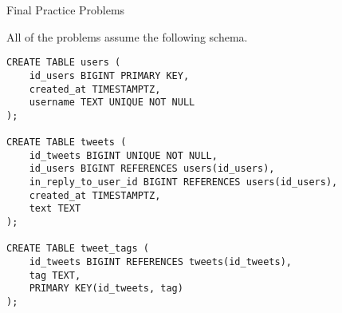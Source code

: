 \documentclass[12pt]{exam}
\theoremstyle{definition}
\begin{document}
\begin{center}
    {
\Large
Final Practice Problems
}
\end{center}

\noindent
All of the problems assume the following schema.
\begin{lstlisting}
CREATE TABLE users (
    id_users BIGINT PRIMARY KEY,
    created_at TIMESTAMPTZ,
    username TEXT UNIQUE NOT NULL
);

CREATE TABLE tweets (
    id_tweets BIGINT UNIQUE NOT NULL,
    id_users BIGINT REFERENCES users(id_users),
    in_reply_to_user_id BIGINT REFERENCES users(id_users),
    created_at TIMESTAMPTZ,
    text TEXT
);

CREATE TABLE tweet_tags (
    id_tweets BIGINT REFERENCES tweets(id_tweets),
    tag TEXT,
    PRIMARY KEY(id_tweets, tag)
);
\end{lstlisting}
\end{document}
